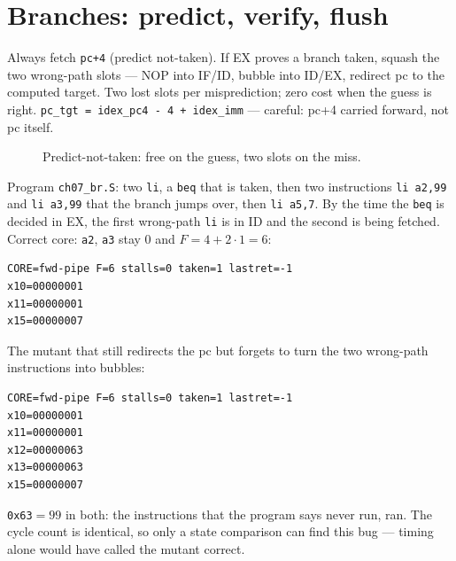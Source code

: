 \section{Branches: predict, verify, flush}
\label{sec:branch07}

\begin{example}\label{ex:pred07}
Always fetch \texttt{pc+4} (predict not-taken). If EX proves a
branch taken, squash the two wrong-path slots --- NOP into IF/ID,
bubble into ID/EX, redirect pc to the computed target. Two lost
slots per misprediction; zero cost when the guess is right.
\texttt{pc\_tgt = idex\_pc4 - 4 + idex\_imm} --- careful: pc+4
carried forward, not pc itself.
\end{example}

\begin{figure}[t]
\centering

\caption[Branch flush]{Predict-not-taken: free on the guess,
two slots on the miss.}
\label{fig:flush07}
\end{figure}

\begin{example}\label{ex:flush07}
Program \texttt{ch07\_br.S}: two \texttt{li}, a \texttt{beq} that is
taken, then two instructions \texttt{li a2,99} and \texttt{li a3,99}
that the branch jumps over, then \texttt{li a5,7}. By the time the
\texttt{beq} is decided in EX, the first wrong-path \texttt{li} is in
ID and the second is being fetched. Correct core: \texttt{a2}, \texttt{a3}
stay 0 and $F=4+2\cdot1=6$:
\begin{lstlisting}
CORE=fwd-pipe F=6 stalls=0 taken=1 lastret=-1
x10=00000001
x11=00000001
x15=00000007
\end{lstlisting}
The mutant that still redirects the pc but forgets to turn the two
wrong-path instructions into bubbles:
\begin{lstlisting}
CORE=fwd-pipe F=6 stalls=0 taken=1 lastret=-1
x10=00000001
x11=00000001
x12=00000063
x13=00000063
x15=00000007
\end{lstlisting}
\texttt{0x63}$=99$ in both: the instructions that the program says never
run, ran. The cycle count is identical, so only a state comparison
can find this bug --- timing alone would have called the mutant
correct.
\end{example}

